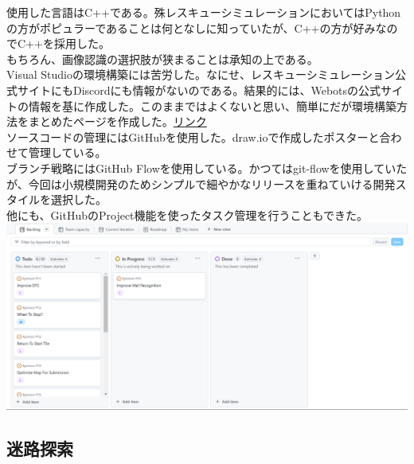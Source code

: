 \documentclass[dvipdfmx,a4paper]{jsarticle}
\begin{document}
    使用した言語はC++である。殊レスキューシミュレーションにおいてはPythonの方がポピュラーであることは何となしに知っていたが、C++の方が好みなのでC++を採用した。\\
    もちろん、画像認識の選択肢が狭まることは承知の上である。\\

    Visual Studioの環境構築には苦労した。なにせ、レスキューシミュレーション公式サイトにもDiscordにも情報がないのである。結果的には、Webotsの公式サイトの情報を基に作成した。このままではよくないと思い、簡単にだが環境構築方法をまとめたページを作成した。\href{https://qiita.com/kikou0517/items/f13045b6b97767e7d0f0}{リンク}\\
    
    ソースコードの管理にはGitHubを使用した。draw.ioで作成したポスターと合わせて管理している。\\
    ブランチ戦略にはGitHub Flowを使用している。かつてはgit-flowを使用していたが、今回は小規模開発のためシンプルで細やかなリリースを重ねていける開発スタイルを選択した。\\
    他にも、GitHubのProject機能を使ったタスク管理を行うこともできた。\\
    \includegraphics[width=150mm]{Photo/1.png}

  \subsection{迷路探索}
\end{document}
